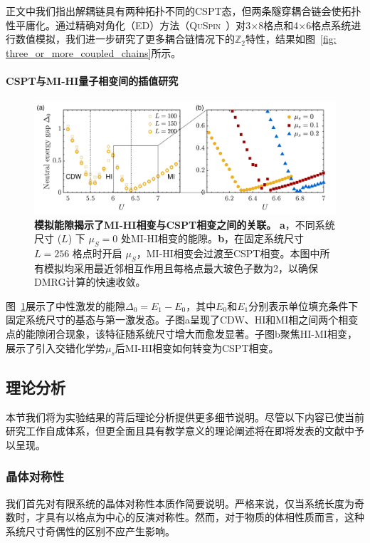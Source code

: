 \documentclass[preprint,superscriptaddress,floatfix,nofootinbib]{revtex4-2}
\begin{document}
正文中我们指出解耦链具有两种拓扑不同的CSPT态，但两条隧穿耦合链会使拓扑性平庸化。通过精确对角化（ED）方法（\textsc{QuSpin}~\cite{QuSpin}）对3×8格点和4×6格点系统进行数值模拟，我们进一步研究了更多耦合链情况下的$\mathbb{Z}_2$特性，结果如图~\ref{fig: three_or_more_coupled_chains}所示。

\paragraph*{CSPT与MI-HI量子相变间的插值研究}

\begin{figure}
    \centering
    \includegraphics[width=\textwidth]{figures/HI_to_CSPT_transition_large_size.pdf}
    \caption{\textbf{模拟能隙揭示了MI-HI相变与CSPT相变之间的关联。} \textbf{a}，不同系统尺寸 ($L$) 下 $\mu_S=0$ 处MI-HI相变的能隙。\textbf{b}，在固定系统尺寸 $L=256$ 格点时开启 $\mu_S$，MI-HI相变会过渡至CSPT相变。本图中所有模拟均采用最近邻相互作用且每格点最大玻色子数为2，以确保DMRG计算的快速收敛。
    }
    \label{fig: HI_to_CSPT_transition_large_size}
\end{figure}

图~\ref{fig: HI_to_CSPT_transition_large_size}展示了中性激发的能隙$\Delta_0=E_1-E_0$，其中$E_0$和$E_1$分别表示单位填充条件下固定系统尺寸的基态与第一激发态。子图a呈现了CDW、HI和MI相之间两个相变点的能隙闭合现象，该特征随系统尺寸增大而愈发显著。子图b聚焦HI-MI相变，展示了引入交错化学势$\mu_s$后MI-HI相变如何转变为CSPT相变。
\subsection*{理论分析}

本节我们将为实验结果的背后理论分析提供更多细节说明。尽管以下内容已使当前研究工作自成体系，但更全面且具有教学意义的理论阐述将在即将发表的文献\cite{Sahay2025}中予以呈现。
\subsubsection*{晶体对称性}
我们首先对有限系统的晶体对称性本质作简要说明。严格来说，仅当系统长度为奇数时，才具有以格点为中心的反演对称性。然而，对于物质的体相性质而言，这种系统尺寸奇偶性的区别不应产生影响。
\end{document}
